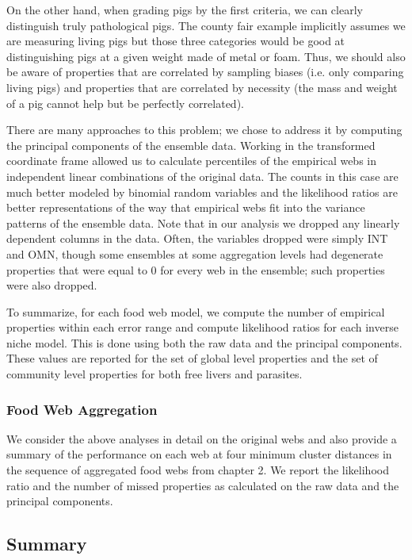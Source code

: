 \documentclass[/home/nkappler/Research/Dissertation/
 dissertation.tex]{subfiles}
\begin{document}
\begin{bibunit}
On the other hand, when grading pigs by the first criteria, we can clearly
distinguish truly pathological pigs. The county fair example implicitly assumes
we are measuring living pigs but those three categories would be good at
distinguishing pigs at a given weight made of metal or foam. Thus, we should
also be aware of properties that are correlated by sampling biases (i.e. only
comparing living pigs) and properties that are correlated by necessity (the
mass and weight of a pig cannot help but be perfectly correlated). 

There are many approaches to this problem; we chose to address it by computing
the principal components of the ensemble data. Working in the transformed
coordinate frame allowed us to calculate percentiles of the empirical webs in
independent linear combinations of the original data. The counts in this case
are much better modeled by binomial random variables and the likelihood ratios
are better representations of the way that empirical webs fit into the variance
patterns of the ensemble data. Note that in our analysis we dropped any
linearly dependent columns in the data. Often, the variables dropped were
simply INT and OMN, though some ensembles at some aggregation levels had
degenerate properties that were equal to 0 for every web in the ensemble; such
properties were also dropped. 

To summarize, for each food web model, we compute the number of empirical
properties within each error range and compute likelihood ratios for each
inverse niche model. This is done using both the raw data and the principal
components. These values are reported for the set of global level properties
and the set of community level properties for both free livers and parasites.

\subsubsection{Food Web Aggregation}

We consider the above analyses in detail on the original webs and also provide
a summary of the performance on each web at four minimum cluster distances in
the sequence of aggregated food webs from chapter 2. We report the likelihood
ratio and the number of missed properties as calculated on the raw data and the
principal components.
 
\subsection{Summary}


\end{bibunit}
\end{document}
